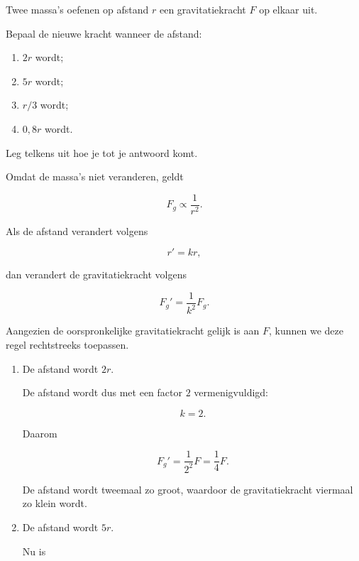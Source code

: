 \documentclass{ximera}
\begin{document}
\begin{oefening}{\oefU\ESS}

Twee massa's oefenen op afstand $r$ een gravitatiekracht $F$ op elkaar
uit.

Bepaal de nieuwe kracht wanneer de afstand:

\begin{enumerate}
  \item $2r$ wordt;
  \item $5r$ wordt;
  \item $r/3$ wordt;
  \item $0{,}8r$ wordt.
\end{enumerate}

Leg telkens uit hoe je tot je antwoord komt.

\begin{oplossing}

      Omdat de massa's niet veranderen, geldt
      
      \[
      F_g\propto\frac{1}{r^2}.
      \]
      
      Als de afstand verandert volgens
      
      \[
      r'=kr,
      \]
      
      dan verandert de gravitatiekracht volgens
      
      \[
      \boxed{
      F_g'=\frac{1}{k^2}F_g.
      }
      \]
      
      Aangezien de oorspronkelijke gravitatiekracht gelijk is aan $F$,
      kunnen we deze regel rechtstreeks toepassen.
      
      \begin{enumerate}
      
        \item De afstand wordt $2r$.
      
        De afstand wordt dus met een factor $2$ vermenigvuldigd:
      
        \[
        k=2.
        \]
      
        Daarom
      
        \[
        F_g'
        =
        \frac{1}{2^2}F
        =
        \boxed{\frac14F}.
        \]
      
        De afstand wordt tweemaal zo groot, waardoor de gravitatiekracht
        viermaal zo klein wordt.
      
      
        \item De afstand wordt $5r$.
      
        Nu is
      

\end{enumerate}
\end{oplossing}
\end{oefening}
\end{document}
